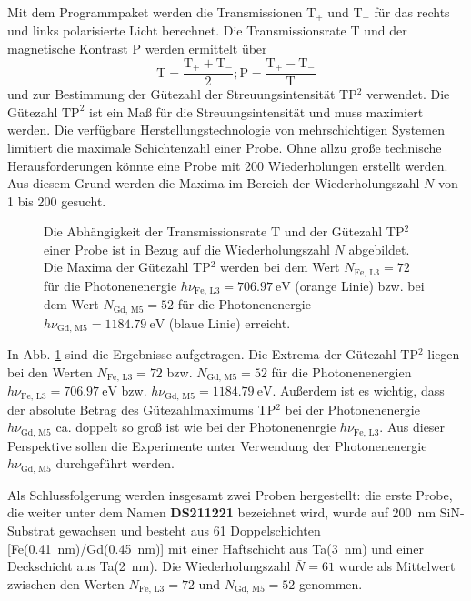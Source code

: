 \noindent
Mit dem Programmpaket werden die Transmissionen T$_+$ und T$_-$ für das rechts und links polarisierte Licht berechnet. Die Transmissionsrate T und der magnetische Kontrast P werden ermittelt über
\begin{equation}
    \text{T} = \frac{\text{T}_+ + \text{T}_-}{2}; \text{P} = \frac{\text{T}_+ - \text{T}_-}{\text{T}}
\end{equation}
und zur Bestimmung der Gütezahl der Streuungsintensität TP$^2$ verwendet. Die Gütezahl $\text{TP}^2$ ist ein Maß für die Streuungsintensität und muss maximiert werden. Die verfügbare Herstellungstechnologie von mehrschichtigen Systemen limitiert die maximale Schichtenzahl einer Probe. Ohne allzu große technische Herausforderungen könnte eine Probe mit 200 Wiederholungen erstellt werden. Aus diesem Grund werden die Maxima im Bereich der Wiederholungszahl $N$ von 1 bis 200 gesucht.
\begin{figure}[H]
    \centering
    
    \caption{Die Abhängigkeit der Transmissionsrate $\text{T}$ und der Gütezahl TP$^2$ einer Probe ist in Bezug auf die Wiederholungszahl $N$ abgebildet. Die Maxima der Gütezahl TP$^2$ werden bei dem Wert $N_{\text{Fe, L3}}=72$ für die Photonenenergie $h\nu_{\text{Fe, L3}}=\SI{706,97}{\eV}$ (orange Linie) bzw. bei dem Wert $N_{\text{Gd, M5}}=52$ für die Photonenenergie $h\nu_{\text{Gd, M5}}=\SI{1184,79}{\eV}$ (blaue Linie) erreicht.}
    \label{fig:proben_vergleich_centered}
\end{figure}
\noindent
In Abb. \ref{fig:proben_vergleich_centered} sind die Ergebnisse aufgetragen. Die Extrema der Gütezahl TP$^2$ liegen bei den Werten $N_{\text{Fe, L3}}=72$  bzw. $N_{\text{Gd, M5}}=52$ für die Photonenenergien $h\nu_{\text{Fe, L3}}=\SI{706,97}{\eV}$ bzw. $h\nu_{\text{Gd, M5}}=\SI{1184,79}{\eV}$. Außerdem ist es wichtig, dass der absolute Betrag des Gütezahlmaximums TP$^2$ bei der Photonenenergie $h\nu_{\text{Gd, M5}}$ ca. doppelt so groß ist wie bei der Photonenenrgie $h\nu_{\text{Fe, L3}}$. Aus dieser Perspektive sollen die Experimente unter Verwendung der Photonenenergie $h\nu_{\text{Gd, M5}}$ durchgeführt werden.

\noindent
Als Schlussfolgerung werden insgesamt zwei Proben hergestellt: die erste Probe, die weiter unter dem Namen \textbf{DS211221} bezeichnet wird, wurde auf \SI{200}{\nano\meter} SiN-Substrat gewachsen und besteht aus 61 Doppelschichten [Fe(\SI{0.41}{\nano\meter})/Gd(\SI{0.45}{\nano\meter})] mit einer Haftschicht aus Ta(\SI{3}{\nano\meter}) und einer Deckschicht aus Ta(\SI{2}{\nano\meter}). Die Wiederholungszahl $\bar{N} = 61$ wurde als Mittelwert zwischen den Werten $N_{\text{Fe, L3}}=72$ und $N_{\text{Gd, M5}}=52$ genommen.

